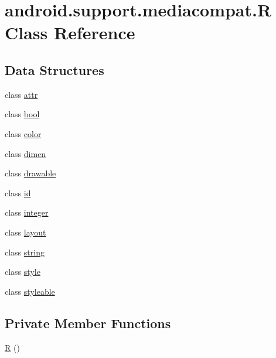 \hypertarget{classandroid_1_1support_1_1mediacompat_1_1_r}{}\section{android.\+support.\+mediacompat.\+R Class Reference}
\label{classandroid_1_1support_1_1mediacompat_1_1_r}
\subsection*{Data Structures}
\begin{DoxyCompactItemize}
\item 
class \mbox{\hyperlink{classandroid_1_1support_1_1mediacompat_1_1_r_1_1attr}{attr}}
\item 
class \mbox{\hyperlink{classandroid_1_1support_1_1mediacompat_1_1_r_1_1bool}{bool}}
\item 
class \mbox{\hyperlink{classandroid_1_1support_1_1mediacompat_1_1_r_1_1color}{color}}
\item 
class \mbox{\hyperlink{classandroid_1_1support_1_1mediacompat_1_1_r_1_1dimen}{dimen}}
\item 
class \mbox{\hyperlink{classandroid_1_1support_1_1mediacompat_1_1_r_1_1drawable}{drawable}}
\item 
class \mbox{\hyperlink{classandroid_1_1support_1_1mediacompat_1_1_r_1_1id}{id}}
\item 
class \mbox{\hyperlink{classandroid_1_1support_1_1mediacompat_1_1_r_1_1integer}{integer}}
\item 
class \mbox{\hyperlink{classandroid_1_1support_1_1mediacompat_1_1_r_1_1layout}{layout}}
\item 
class \mbox{\hyperlink{classandroid_1_1support_1_1mediacompat_1_1_r_1_1string}{string}}
\item 
class \mbox{\hyperlink{classandroid_1_1support_1_1mediacompat_1_1_r_1_1style}{style}}
\item 
class \mbox{\hyperlink{classandroid_1_1support_1_1mediacompat_1_1_r_1_1styleable}{styleable}}
\end{DoxyCompactItemize}
\subsection*{Private Member Functions}
\begin{DoxyCompactItemize}
\item 
\mbox{\hyperlink{classandroid_1_1support_1_1mediacompat_1_1_r_a57c7ac186b73e61e21481806c097f290}{R}} ()
\end{DoxyCompactItemize}



